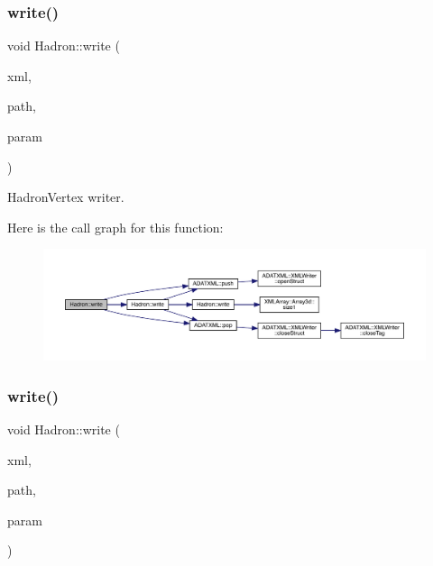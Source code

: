 \subsubsection{\texorpdfstring{write()}{write()}\hspace{0.1cm}{\footnotesize\ttfamily [49/95]}}
{\footnotesize\ttfamily void Hadron\+::write (\begin{DoxyParamCaption}\item[{\mbox{\hyperlink{classADATXML_1_1XMLWriter}{X\+M\+L\+Writer}} \&}]{xml,  }\item[{const std\+::string \&}]{path,  }\item[{const \mbox{\hyperlink{structHadron_1_1HadronVertex__t}{Hadron\+Vertex\+\_\+t}} \&}]{param }\end{DoxyParamCaption})}



Hadron\+Vertex writer. 

Here is the call graph for this function\+:
\nopagebreak
\begin{figure}[H]
\begin{center}
\leavevmode
\includegraphics[width=350pt]{d1/daf/namespaceHadron_a9309edc67ae704a831f01ae854c5bf12_cgraph}
\end{center}
\end{figure}
\mbox{\label{namespaceHadron_a9d260315c8fc49d172ff22fd3abb49c9}} 
\subsubsection{\texorpdfstring{write()}{write()}\hspace{0.1cm}{\footnotesize\ttfamily [50/95]}}
{\footnotesize\ttfamily void Hadron\+::write (\begin{DoxyParamCaption}\item[{\mbox{\hyperlink{classADATXML_1_1XMLWriter}{X\+M\+L\+Writer}} \&}]{xml,  }\item[{const std\+::string \&}]{path,  }\item[{const \mbox{\hyperlink{structHadron_1_1KeyPeramDist__t}{Key\+Peram\+Dist\+\_\+t}} \&}]{param }\end{DoxyParamCaption})}



